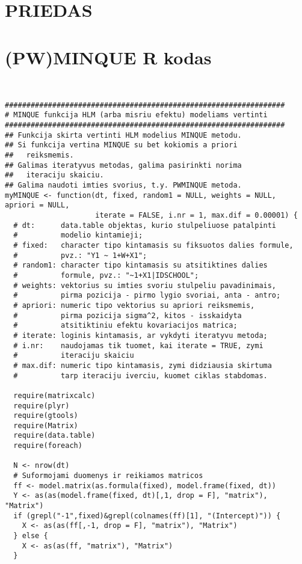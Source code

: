 \documentclass[12pt,a4paper]{article}
\begin{document}
\newpage
\begin{appendix}

 \hypertarget{appendix}{\section*{PRIEDAS}}
\section{(PW)MINQUE R kodas}
\begin{footnotesize}
\begin{verbatim}


#################################################################
# MINQUE funkcija HLM (arba misriu efektu) modeliams vertinti
#################################################################
## Funkcija skirta vertinti HLM modelius MINQUE metodu. 
## Si funkcija vertina MINQUE su bet kokiomis a priori 
##   reiksmemis.
## Galimas iteratyvus metodas, galima pasirinkti norima 
##   iteraciju skaiciu.
## Galima naudoti imties svorius, t.y. PWMINQUE metoda.
myMINQUE <- function(dt, fixed, random1 = NULL, weights = NULL, apriori = NULL,
                     iterate = FALSE, i.nr = 1, max.dif = 0.00001) {
  # dt:      data.table objektas, kurio stulpeliuose patalpinti 
  #          modelio kintamieji;
  # fixed:   character tipo kintamasis su fiksuotos dalies formule,
  #          pvz.: "Y1 ~ 1+W+X1";
  # random1: character tipo kintamasis su atsitiktines dalies
  #          formule, pvz.: "~1+X1|IDSCHOOL";
  # weights: vektorius su imties svoriu stulpeliu pavadinimais,
  #          pirma pozicija - pirmo lygio svoriai, anta - antro;
  # apriori: numeric tipo vektorius su apriori reiksmemis,
  #          pirma pozicija sigma^2, kitos - isskaidyta 
  #          atsitiktiniu efektu kovariacijos matrica;
  # iterate: loginis kintamasis, ar vykdyti iteratyvu metoda;
  # i.nr:    naudojamas tik tuomet, kai iterate = TRUE, zymi
  #          iteraciju skaiciu
  # max.dif: numeric tipo kintamasis, zymi didziausia skirtuma
  #          tarp iteraciju iverciu, kuomet ciklas stabdomas.
  
  require(matrixcalc)
  require(plyr)
  require(gtools)
  require(Matrix)
  require(data.table)
  require(foreach)
  
  N <- nrow(dt)
  # Suformojami duomenys ir reikiamos matricos
  ff <- model.matrix(as.formula(fixed), model.frame(fixed, dt))
  Y <- as(as(model.frame(fixed, dt)[,1, drop = F], "matrix"), "Matrix")
  if (grepl("-1",fixed)&grepl(colnames(ff)[1], "(Intercept)")) {
    X <- as(as(ff[,-1, drop = F], "matrix"), "Matrix")
  } else {
    X <- as(as(ff, "matrix"), "Matrix")
  }
  

\end{verbatim}
\end{footnotesize}
\end{appendix}
\end{document}
